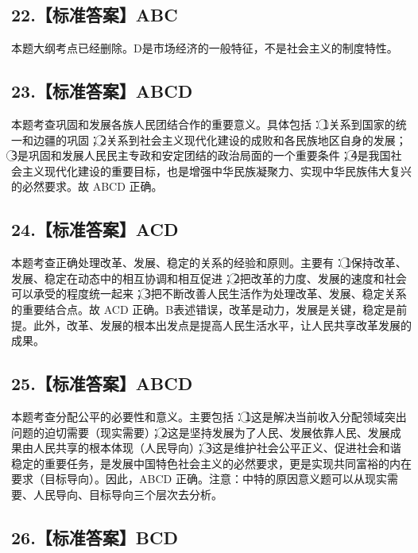 \documentclass[UTF8,11pt]{ctexart}
\begin{document}
\subsection*{22.【标准答案】ABC}

本题大纲考点已经删除。D是市场经济的一般特征，不是社会主义的制度特性。


\subsection*{23.【标准答案】ABCD}

本题考查巩固和发展各族人民团结合作的重要意义。具体包括：\textcircled{1}关系到国家的统一和边疆的巩固；\textcircled{2}关系到社会主义现代化建设的成败和各民族地区自身的发展；\textcircled{3}是巩固和发展人民民主专政和安定团结的政治局面的一个重要条件；\textcircled{4}是我国社会主义现代化建设的重要目标，也是增强中华民族凝聚力、实现中华民族伟大复兴的必然要求。故 ABCD 正确。


\subsection*{24.【标准答案】ACD}

本题考查正确处理改革、发展、稳定的关系的经验和原则。主要有：\textcircled{1}保持改革、发展、稳定在动态中的相互协调和相互促进；\textcircled{2}把改革的力度、发展的速度和社会可以承受的程度统一起来；\textcircled{3}把不断改善人民生活作为处理改革、发展、稳定关系的重要结合点。故 ACD 正确。B表述错误，改革是动力，发展是关键，稳定是前提。此外，改革、发展的根本出发点是提高人民生活水平，让人民共享改革发展的成果。


\subsection*{25.【标准答案】ABCD}

本题考查分配公平的必要性和意义。主要包括：\textcircled{1}这是解决当前收入分配领域突出问题的迫切需要（现实需要）；\textcircled{2}这是坚持发展为了人民、发展依靠人民、发展成果由人民共享的根本体现（人民导向）；\textcircled{3}这是维护社会公平正义、促进社会和谐稳定的重要任务，是发展中国特色社会主义的必然要求，更是实现共同富裕的内在要求（目标导向）。因此，ABCD 正确。注意：中特的原因意义题可以从现实需要、人民导向、目标导向三个层次去分析。


\subsection*{26.【标准答案】BCD}
\end{document}
